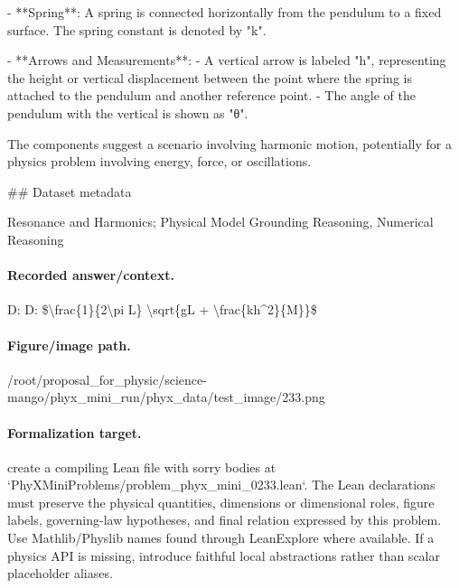 - **Spring**: A spring is connected horizontally from the pendulum to a fixed surface. The spring constant is denoted by "k".

- **Arrows and Measurements**:
  - A vertical arrow is labeled "h", representing the height or vertical displacement between the point where the spring is attached to the pendulum and another reference point.
  - The angle of the pendulum with the vertical is shown as "θ".

The components suggest a scenario involving harmonic motion, potentially for a physics problem involving energy, force, or oscillations.

\#\# Dataset metadata

Resonance and Harmonics; Physical Model Grounding Reasoning, Numerical Reasoning

\paragraph{Recorded answer/context.}
D: D: \$\textbackslash{}frac\{1\}\{2\textbackslash{}pi L\} \textbackslash{}sqrt\{gL + \textbackslash{}frac\{kh\textasciicircum{}2\}\{M\}\}\$

\paragraph{Figure/image path.}
/root/proposal\_for\_physic/science-mango/phyx\_mini\_run/phyx\_data/test\_image/233.png

\paragraph{Formalization target.}
create a compiling Lean file with sorry bodies at `PhyXMiniProblems/problem\_phyx\_mini\_0233.lean`. The Lean declarations must preserve the physical quantities, dimensions or dimensional roles, figure labels, governing-law hypotheses, and final relation expressed by this problem.
Use Mathlib/Physlib names found through LeanExplore where available. If a physics API is missing, introduce faithful local abstractions rather than scalar placeholder aliases.

